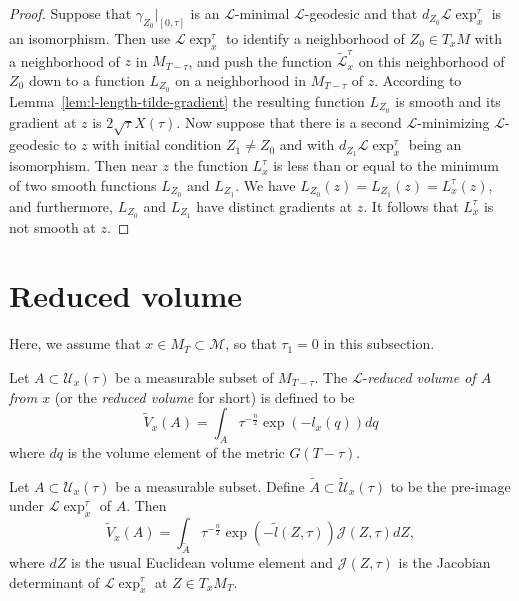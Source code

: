 \begin{proof}
\sketch
Suppose that
$\gamma_{Z_0}|_{[0,\tau]}$ is an ${\mathcal L}$-minimal ${\mathcal L}$-geodesic
and that $d_{Z_0}{\mathcal L}\exp_x^\tau$ is an isomorphism. Then use
${\mathcal L}\exp_x^{\tau}$ to identify a neighborhood of $Z_0\in T_xM$
with a neighborhood of $z$ in $M_{T-\tau}$, and push  the function
$\widetilde{\mathcal L}^\tau_x$ on this neighborhood of $Z_0$ down to a
function $L_{Z_0}$ on a neighborhood in $M_{T-\tau}$ of $z$. According to
Lemma~\ref{lem:l-length-tilde-gradient} the resulting function $L_{Z_0}$ is smooth and its gradient
at $z$ is $2\sqrt{\tau}X(\tau)$. Now suppose that there is a second ${\mathcal
L}$-minimizing ${\mathcal L}$-geodesic to $z$ with initial condition
$Z_1\not=Z_0$ and with $d_{Z_1}{\mathcal L}\exp_x^\tau$ being an
isomorphism. Then near $z$ the function $L_x^{\tau}$ is less than or equal to
the minimum of two smooth functions $L_{Z_0}$ and $L_{Z_1}$. We have
$L_{Z_0}(z)=L_{Z_1}(z)=L_x^\tau(z)$,  and furthermore, $L_{Z_0}$ and $L_{Z_1}$
have distinct gradients at $z$. It follows that $L_x^{\tau}$ is not smooth at
$z$.
\end{proof}


\section{Reduced volume}

Here, we  assume that $x\in M_T\subset {\mathcal M}$, so that
$\tau_1=0$ in this subsection.


\begin{definition}\label{def:reduced-volume}
\label{redvol}
Let $A\subset {\mathcal U}_x(\tau)$ be a  measurable subset of
$M_{T-\tau}$. The $\mathcal{L}$-{\em reduced volume of $A$ from $x$}
(or the {\em reduced volume} for short) is
defined to be
$$\widetilde V_x(A) = \int_{A} \tau^{-\frac{n}{2}}\exp(-l_x(q))dq$$ where $dq$ is the volume
element of the metric $G(T-\tau)$.
\end{definition}




\begin{lemma}\label{lem:reduced-volume-pullback}
\label{redvoltilde}
Let $A\subset {\mathcal U}_x(\tau)$ be a  measurable subset. Define
$\widetilde A\subset \widetilde{\mathcal U}_x(\tau)$ to be the
pre-image under ${\mathcal L}\exp_x^{\tau}$ of $A$. Then
$$\widetilde V_x(A)=\int_{\widetilde A}\tau^{-\frac{n}{2}}\exp(-\tilde l(Z, \tau)){\mathcal J}(Z,\tau)dZ,$$ where $dZ$ is the usual
Euclidean volume element and ${\mathcal J}(Z,\tau)$ is the Jacobian determinant
of ${\mathcal L}\exp_x^{\tau}$ at $Z\in T_xM_T$.
\end{lemma}

